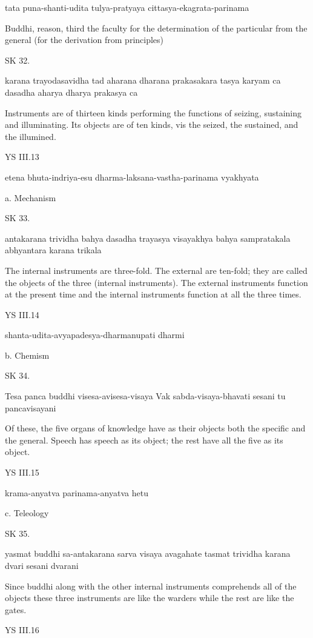     tata puna-shanti-udita tulya-pratyaya cittasya-ekagrata-parinama

    Buddhi, reason, third the faculty for the determination of
    the particular from the general (for the derivation from principles)


SK 32.

karana trayodasavidha tad aharana dharana prakasakara
tasya karyam ca dasadha aharya dharya prakasya ca

Instruments are of thirteen kinds performing the functions of
seizing, sustaining and illuminating.
Its objects are of ten kinds, vis
the seized, the sustained, and the illumined.

YS III.13

    etena bhuta-indriya-esu dharma-laksana-vastha-parinama vyakhyata

    a. Mechanism

SK 33.

antakarana trividha bahya dasadha trayasya visayakhya
bahya sampratakala abhyantara karana trikala

The internal instruments are three-fold.
The external are ten-fold;
they are called the objects of the three (internal instruments).
The external instruments function at the present time and
the internal instruments function at all the three times.

YS III.14

    shanta-udita-avyapadesya-dharmanupati dharmi

    b. Chemism

SK 34.

Tesa panca buddhi visesa-avisesa-visaya
Vak sabda-visaya-bhavati sesani tu pancavisayani

Of these, the five organs of knowledge have as their objects
both the specific and the general.
Speech has speech as its object;
the rest have all the five as its object.

YS III.15

    krama-anyatva parinama-anyatva hetu

    c. Teleology

SK 35.

yasmat buddhi sa-antakarana sarva visaya avagahate
tasmat trividha karana dvari sesani dvarani

Since buddhi along with the other internal instruments
comprehends all of the objects these three instruments are
like the warders while the rest are like the gates.

YS III.16

